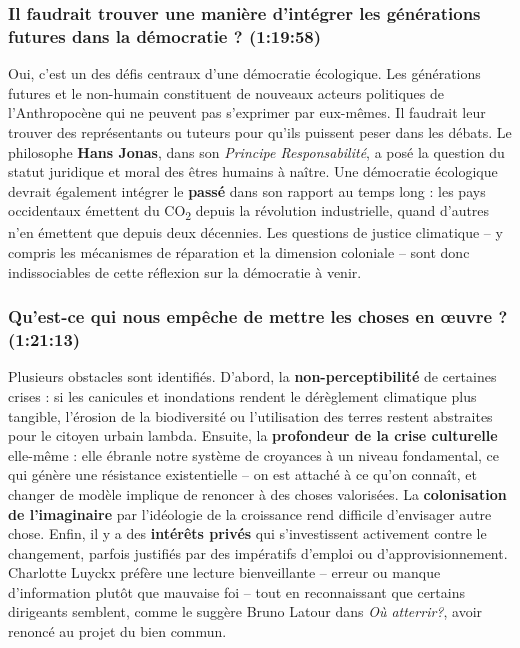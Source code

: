 \subsubsection{Il faudrait trouver une manière d'intégrer les générations futures dans la démocratie ? \textnormal{\small(1:19:58)}}

Oui, c'est un des défis centraux d'une démocratie écologique. Les générations futures et le non-humain constituent de nouveaux acteurs politiques de l'Anthropocène qui ne peuvent pas s'exprimer par eux-mêmes. Il faudrait leur trouver des représentants ou tuteurs pour qu'ils puissent peser dans les débats. Le philosophe \textbf{Hans Jonas}, dans son \textit{Principe Responsabilité}, a posé la question du statut juridique et moral des êtres humains à naître. Une démocratie écologique devrait également intégrer le \textbf{passé} dans son rapport au temps long : les pays occidentaux émettent du CO\textsubscript{2} depuis la révolution industrielle, quand d'autres n'en émettent que depuis deux décennies. Les questions de justice climatique -- y compris les mécanismes de réparation et la dimension coloniale -- sont donc indissociables de cette réflexion sur la démocratie à venir.

\subsubsection{Qu'est-ce qui nous empêche de mettre les choses en œuvre ? \textnormal{\small(1:21:13)}}

Plusieurs obstacles sont identifiés. D'abord, la \textbf{non-perceptibilité} de certaines crises : si les canicules et inondations rendent le dérèglement climatique plus tangible, l'érosion de la biodiversité ou l'utilisation des terres restent abstraites pour le citoyen urbain lambda. Ensuite, la \textbf{profondeur de la crise culturelle} elle-même : elle ébranle notre système de croyances à un niveau fondamental, ce qui génère une résistance existentielle -- on est attaché à ce qu'on connaît, et changer de modèle implique de renoncer à des choses valorisées. La \textbf{colonisation de l'imaginaire} par l'idéologie de la croissance rend difficile d'envisager autre chose. Enfin, il y a des \textbf{intérêts privés} qui s'investissent activement contre le changement, parfois justifiés par des impératifs d'emploi ou d'approvisionnement. Charlotte Luyckx préfère une lecture bienveillante -- erreur ou manque d'information plutôt que mauvaise foi -- tout en reconnaissant que certains dirigeants semblent, comme le suggère Bruno Latour dans \textit{Où atterrir?}, avoir renoncé au projet du bien commun.

